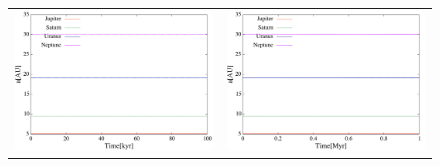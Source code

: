 \documentclass[11pt,a4paper,oneside,onecolumn]{jarticle}
\begin{document}
\begin{figure}[H]
\begin{tabular}{cc}
\begin{minipage}[t]{0.45\hsize}
\centering
\includegraphics[width=7.6cm]{./image/Nomove_a_100kyr.pdf}
\end{minipage} &
\begin{minipage}[t]{0.45\hsize}
\centering
\includegraphics[width=7.6cm]{./image/Nomove_a_1Myr.pdf}
\end{minipage}
%
\end{tabular}
\caption{\label{}}
\end{figure}
\end{document}
